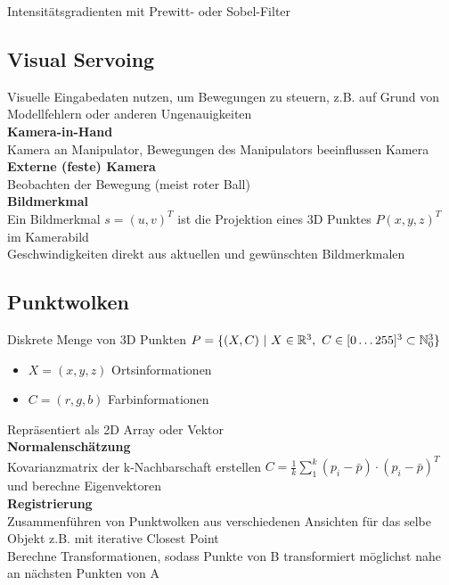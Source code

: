 Intensitätsgradienten mit Prewitt- oder Sobel-Filter

\subsection{Visual Servoing}
Visuelle Eingabedaten nutzen, um Bewegungen zu steuern, z.B. auf Grund von Modellfehlern oder anderen Ungenauigkeiten\\

\textbf{Kamera-in-Hand}\\
Kamera an Manipulator, Bewegungen des Manipulators beeinflussen Kamera\\

\textbf{Externe (feste) Kamera}\\
Beobachten der Bewegung (meist roter Ball)\\

\textbf{Bildmerkmal}\\
Ein Bildmerkmal \(s = (u,v)^T\) ist die Projektion eines 3D Punktes \(P (x, y, z)^T\) im Kamerabild\\
Geschwindigkeiten direkt aus aktuellen und gewünschten Bildmerkmalen\\

\subsection{Punktwolken}
Diskrete Menge von 3D Punkten \(P = \{(X, C)\ |\ X \in \mathbb{R}^3,\ C \in [0 \ldots 255]^3 \subset \mathbb{N}^3_0\}\)
\begin{itemize}
\item \(X = (x, y, z)\) Ortsinformationen
\item \(C = (r, g, b)\) Farbinformationen
\end{itemize}
Repräsentiert als 2D Array oder Vektor\\

\textbf{Normalenschätzung}\\
Kovarianzmatrix der k-Nachbarschaft erstellen \(C = \frac{1}{k} \sum_1^k (p_i - \bar{p}) \cdot (p_i - \bar{p})^T\)
und berechne Eigenvektoren\\

\textbf{Registrierung}\\
Zusammenführen von Punktwolken aus verschiedenen Ansichten für das selbe Objekt
z.B. mit iterative Closest Point\\
Berechne Transformationen, sodass Punkte von B transformiert möglichst nahe an nächsten Punkten von A

